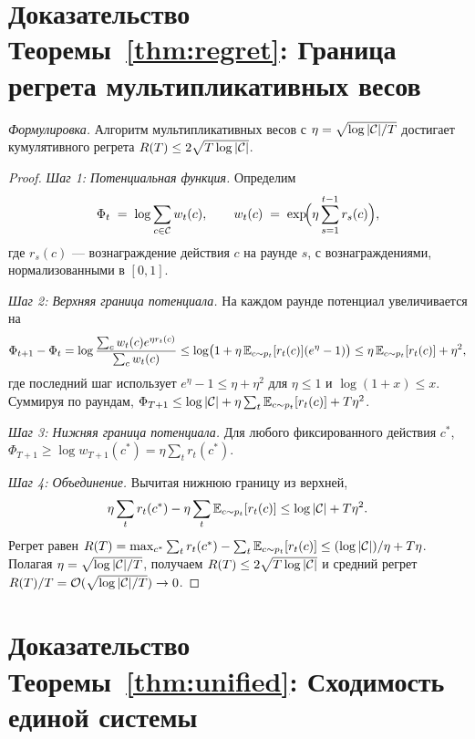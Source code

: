 \section{Доказательство Теоремы~\ref{thm:regret}: Граница регрета мультипликативных весов}
\label{app:proof_regret}

\noindent\textit{Формулировка.} Алгоритм мультипликативных весов с $\eta=\sqrt{\log|\mathcal{C}|/T}$ достигает кумулятивного регрета $R(T)\le 2\sqrt{T\log|\mathcal{C}|}$.

\begin{proof}
\textit{Шаг 1: Потенциальная функция.} Определим
\begin{equation*}
\Phi_t \;=\; \log\sum_{c\in\mathcal{C}}w_t(c),
\qquad
w_t(c) \;=\; \exp\!\Bigl(\eta\sum_{s=1}^{t-1}r_s(c)\Bigr),
\end{equation*}
где $r_s(c)$ --- вознаграждение действия $c$ на раунде $s$, с
вознаграждениями, нормализованными в $[0,1]$.

\textit{Шаг 2: Верхняя граница потенциала.} На каждом раунде потенциал увеличивается на
\begin{equation}
\Phi_{t+1}-\Phi_t = \log\frac{\sum_c w_t(c)e^{\eta r_t(c)}}{\sum_c w_t(c)}
\le \log\bigl(1+\eta\,\mathbb{E}_{c\sim p_t}[r_t(c)](e^\eta-1)\bigr)
\le \eta\,\mathbb{E}_{c\sim p_t}[r_t(c)] + \eta^2,
\end{equation}
где последний шаг использует $e^\eta-1\le\eta+\eta^2$ для $\eta\le 1$ и $\log(1+x)\le x$. Суммируя по раундам, $\Phi_{T+1}\le\log|\mathcal{C}|+\eta\sum_t\mathbb{E}_{c\sim p_t}[r_t(c)]+T\eta^2$.

\textit{Шаг 3: Нижняя граница потенциала.} Для любого фиксированного действия $c^*$, $\Phi_{T+1}\ge\log w_{T+1}(c^*) = \eta\sum_t r_t(c^*)$.

\textit{Шаг 4: Объединение.} Вычитая нижнюю границу из верхней,
\begin{equation}
\eta\sum_t r_t(c^*) - \eta\sum_t\mathbb{E}_{c\sim p_t}[r_t(c)] \le \log|\mathcal{C}| + T\eta^2.
\end{equation}
Регрет равен $R(T) = \max_{c^*}\sum_t r_t(c^*) - \sum_t\mathbb{E}_{c\sim p_t}[r_t(c)] \le (\log|\mathcal{C}|)/\eta + T\eta$. Полагая $\eta=\sqrt{\log|\mathcal{C}|/T}$, получаем $R(T)\le 2\sqrt{T\log|\mathcal{C}|}$ и средний регрет $R(T)/T = \mathcal{O}(\sqrt{\log|\mathcal{C}|/T})\to 0$.
\end{proof}


\section{Доказательство Теоремы~\ref{thm:unified}: Сходимость единой системы}
\label{app:proof_unified}


